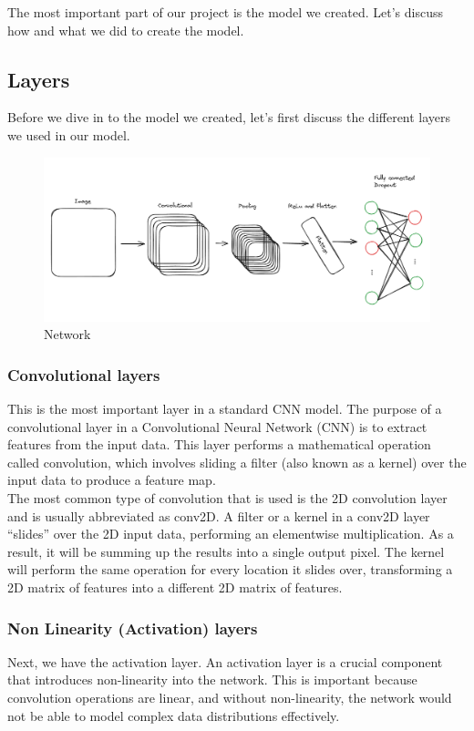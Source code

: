 \documentclass[../paper.tex]{subfiles}
\begin{document}
    The most important part of our project is the model we created.
    Let's discuss how and what we did to create the model.
    \subsection{Layers}
    Before we dive in to the model we created, let's first discuss the different layers we used in our model.

    \begin{figure}[h]
        \centering
        \includegraphics[width=\linewidth]{network}
        \caption{Network}
        \label{fig:network}
    \end{figure}

    \subsubsection{Convolutional layers}
    This is the most important layer in a standard CNN model.
    The purpose of a convolutional layer in a Convolutional Neural Network (CNN) is to extract features from the input data. 
    This layer performs a mathematical operation called convolution, 
    which involves sliding a filter (also known as a kernel) over the input data to produce a feature map.\cite{o4}\\
    The most common type of convolution that is used is the 2D convolution layer and is usually abbreviated as conv2D. 
    A filter or a kernel in a conv2D layer “slides” over the 2D input data, performing an elementwise multiplication. 
    As a result, it will be summing up the results into a single output pixel. 
    The kernel will perform the same operation for every location it slides over, transforming a 2D matrix of features into a different 2D matrix of features.\cite{o5}
    \subsubsection{Non Linearity (Activation) layers}
    Next, we have the activation layer.
    An activation layer is a crucial component that introduces non-linearity into the network. 
    This is important because convolution operations are linear, and without non-linearity, the network would not be able to model complex data distributions effectively.
\end{document}
